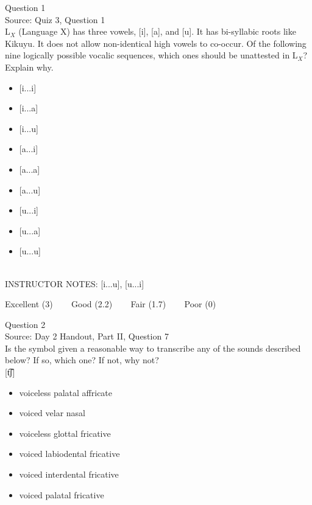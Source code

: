 \documentclass[12pt]{article}
\begin{document}
\begin{center}
\textbf{{\color{blue}{\HUGE START OF EXAM\\}}}

\textbf{{\color{blue}{\HUGE Student ID: 9450\\}}}

\textbf{{\color{blue}{\HUGE 4:15 - 4:30 PM\\}}}

\end{center}
\newpage

{\large Question 1}\\

Source: Quiz 3, Question 1\\

L$_X$ (Language X) has three vowels, [i], [a], and [u]. It has bi-syllabic roots like Kikuyu. It does not allow non-identical high vowels to co-occur. Of the following nine logically possible vocalic sequences, which ones should be unattested in L$_X$? Explain why.\\

\begin{itemize} \item {[i...i]} \item {[i...a]} \item {[i...u]} \item {[a...i]} \item {[a...a]} \item {[a...u]} \item {[u...i]} \item {[u...a]} \item {[u...u]} \end{itemize}


~\\
INSTRUCTOR NOTES: [i...u], [u...i]


\vfill
Excellent (3) ~~~ Good (2.2) ~~~ Fair (1.7) ~~~ Poor (0)
\newpage

{\large Question 2}\\

Source: Day 2 Handout, Part II, Question 7\\

Is the symbol given a reasonable way to transcribe any of the sounds described below? If so, which one? If not, why not?\\

{[t͡ʃ]}

\begin{itemize} \item voiceless palatal affricate \item voiced velar nasal \item voiceless glottal fricative \item voiced labiodental fricative \item voiced interdental fricative \item voiced palatal fricative \end{itemize}
\end{document}
